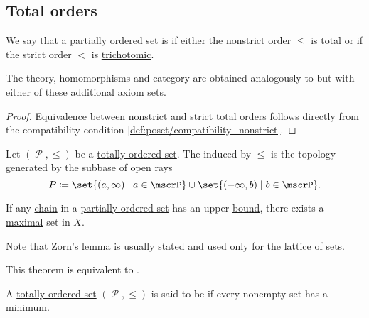 \subsection{Total orders}\label{subsec:total_orders}

\begin{definition}\label{def:totally_ordered_set}
  We say that a partially ordered set is  if either the nonstrict order \( \leq \) is \hyperref[def:binary_relation/total]{total} or if the strict order \( < \) is \hyperref[def:binary_relation/trichotomic]{trichotomic}.

  The theory, homomorphisms and category are obtained analogously to  but with either of these additional axiom sets.
\end{definition}
\begin{proof}
  Equivalence between nonstrict and strict total orders follows directly from the compatibility condition \eqref{def:poset/compatibility_nonstrict}.
\end{proof}

\begin{definition}\label{def:order_topology}
  Let \( (\mscrP, \leq) \) be a \hyperref[def:poset]{totally ordered set}. The  induced by \( \leq \) is the topology generated by the \hyperref[def:topological_subbase]{subbase} of open \hyperref[def:poset_interval/ray]{rays}
  \begin{equation*}
    P \coloneqq \set{ (a, \infty) \given a \in \mscrP } \cup \set{ (-\infty, b) \given b \in \mscrP }.
  \end{equation*}
\end{definition}

\begin{lemma}\label{thm:zorns_lemma}
  If any \hyperref[def:poset_chain_and_antichain]{chain} in a \hyperref[def:poset]{partially ordered set} has an upper \hyperref[def:preordered_set/upper_and_lower_bounds]{bound}, there exists a \hyperref[def:preordered_set/maximal_and_minimal_element]{maximal} set in \( X \).

  Note that Zorn's lemma is usually stated and used only for the \hyperref[thm:subsets_form_boolean_algebra]{lattice of sets}.

  This theorem is equivalent to .
\end{lemma}

\begin{definition}\label{def:well_ordered_set}
  A \hyperref[def:totally_ordered_set]{totally ordered set} \( (\mscrP, \leq) \) is said to be  if every nonempty set has a \hyperref[def:preordered_set/maximum_and_minimum]{minimum}.
\end{definition}

